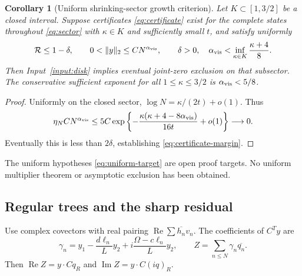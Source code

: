 \documentclass[11pt]{article}
\newtheorem{corollary}[theorem]{Corollary}
\theoremstyle{definition}
\theoremstyle{remark}
\newcommand{\Rea}{\operatorname{Re}}
\newcommand{\Ima}{\operatorname{Im}}
\begin{document}
\begin{corollary}[Uniform shrinking-sector growth criterion]
\label{cor:growth}
Let $K\subset[1,3/2]$ be a closed interval. Suppose certificates
\eqref{eq:certificate} exist for the complete states throughout
\eqref{eq:sector} with $\kappa\in K$ and sufficiently small $t$, and
satisfy uniformly
\begin{equation}
 \mathcal R\le1-\delta,\qquad
 0<\|y\|_2\le C N^{\alpha_{\rm vis}},\qquad
 \delta>0,\quad
 \alpha_{\rm vis}<\inf_{\kappa\in K}\frac{\kappa+4}{8}.
 \label{eq:uniform-target}
\end{equation}
Then Input~\ref{input:disk} implies eventual joint-zero exclusion on
that subsector. The conservative sufficient exponent for all
$1\le\kappa\le3/2$ is $\alpha_{\rm vis}<5/8$.
\end{corollary}
\begin{proof}
Uniformly on the closed sector,
$\log N=\kappa/(2t)+o(1)$. Thus
\[
 \eta_N C N^{\alpha_{\rm vis}}
 \le5C\exp\left\{-\frac{\kappa(\kappa+4-8\alpha_{\rm vis})}{16t}
                         +o(1)\right\}\longrightarrow0.
\]
Eventually this is less than $2\delta$, establishing
\eqref{eq:certificate-margin}.
\end{proof}

The uniform hypotheses \eqref{eq:uniform-target} are open proof targets.
No uniform multiplier theorem or asymptotic exclusion has been obtained.

\subsection{Regular trees and the sharp residual}
\label{sec:sharp-adjoint}

Use complex covectors with real pairing
$\Rea\sum\overline{h_n}v_n$. The coefficients of $C^Ty$ are
\begin{equation}
 \gamma_n=y_1-\frac{d\ell_n}{L}y_2
                   +i\frac{\Omega-c\ell_n}{L}y_2,\qquad
 Z=\sum_{n\le N}\gamma_n\overline{q_n}.
 \label{eq:adjoint-gamma}
\end{equation}
Then $\Rea Z=y\cdot Cq_R$ and $\Ima Z=y\cdot C(iq)_R$.
\end{document}

